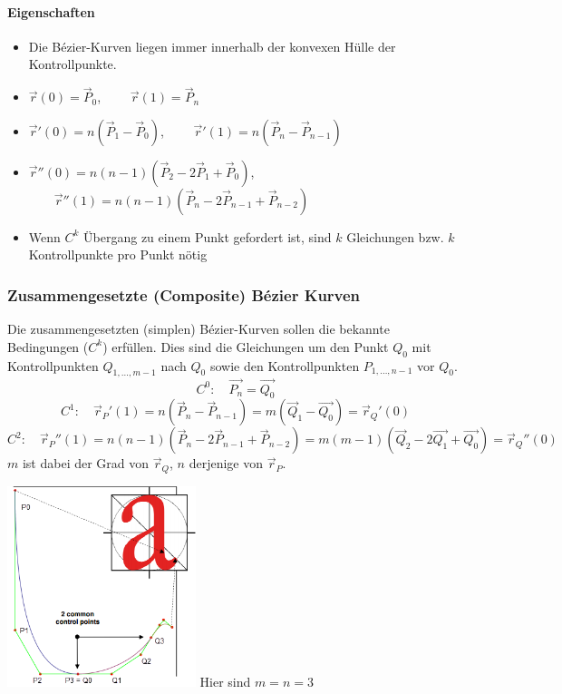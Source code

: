 \paragraph{Eigenschaften}
\begin{itemize}
  \item Die Bézier-Kurven liegen immer innerhalb der konvexen Hülle der Kontrollpunkte.
  \item $\vec{r}(0) = \vec{P}_0$, 
        $\qquad \vec{r}(1) = \vec{P}_n$
  \item $\vec{r} '(0) = n(\vec{P}_1-\vec{P}_0)$, 
        $\qquad \vec{r}'(1) = n(\vec{P}_n-\vec{P}_{n-1})$
  \item $\vec{r} ''(0) = n(n-1)(\vec{P}_2 - 2\vec{P}_1 + \vec{P}_0)$,
        $\qquad \vec{r} ''(1) = n(n-1)(\vec{P}_n - 2\vec{P}_{n-1} + \vec{P}_{n-2})$
  \item Wenn $C^k$ Übergang zu einem Punkt gefordert ist, sind $k$ Gleichungen bzw. $k$ 
        Kontrollpunkte pro Punkt nötig
\end{itemize}


\begin{minipage}{13.5cm}
  \subsubsection{Zusammengesetzte (Composite) Bézier Kurven}
  Die zusammengesetzten (simplen) Bézier-Kurven sollen die bekannte Bedingungen ($C^k$) erfüllen.
  Dies sind die Gleichungen um den Punkt $Q_0$ mit Kontrollpunkten $Q_{1,\ldots,m-1}$ nach $Q_0$ sowie
  den Kontrollpunkten $P_{1,\ldots,n-1}$ vor $Q_0$. 
  $$C^0: \quad \boxed{\vec{P_n} = \vec{Q_0}}$$
  $$C^1: \quad \vec{r}_P'(1) = \boxed{n(\vec{P}_n-\vec{P}_{n-1}) = m(\vec{Q}_1-\vec{Q_0})} = \vec{r}_Q'(0)$$
  $$C^2: \quad \vec{r}_P''(1) = \boxed{n(n-1)(\vec{P}_n - 2\vec{P}_{n-1} + \vec{P}_{n-2}) = 
    m(m-1)(\vec{Q}_2 - 2\vec{Q_1} + \vec{Q_0})} = \vec{r}_Q''(0)$$
  $m$ ist dabei der Grad von $\vec{r}_Q$, $n$ derjenige von $\vec{r}_P$.
\end{minipage}
\begin{minipage}{5.5cm}
  \includegraphics[width=5.5cm]{./bilder/composite_bezier.png}
  Hier sind $m=n=3$
\end{minipage}

